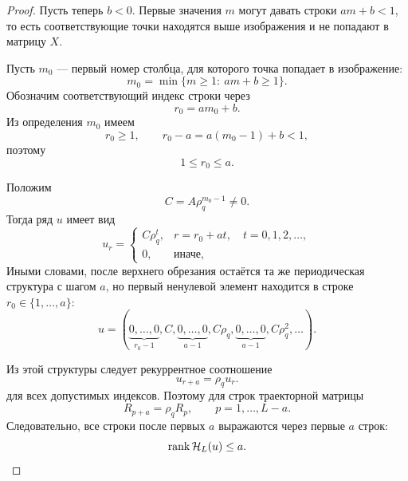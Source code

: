 \begin{proof}
Пусть теперь $b<0$. Первые значения $m$ могут давать строки $am+b<1$, то есть соответствующие точки находятся выше изображения и не попадают в матрицу $X$.

Пусть $m_0$ --- первый номер столбца, для которого точка попадает в изображение:
\begin{equation*}
    m_0=\min\{m\ge1:\ am+b\ge1\}.
\end{equation*}
Обозначим соответствующий индекс строки через
\begin{equation*}
    r_0=am_0+b.
\end{equation*}
Из определения $m_0$ имеем
\begin{equation*}
    r_0\ge1,
    \qquad
    r_0-a=a(m_0-1)+b<1,
\end{equation*}
поэтому
\begin{equation*}
    1\le r_0\le a.
\end{equation*}

Положим
\begin{equation*}
    C=A\rho_q^{m_0-1}\ne0.
\end{equation*}
Тогда ряд $u$ имеет вид
\begin{equation}
    u_r
    =
    \begin{cases}
        C\rho_q^t, & r=r_0+at,\quad t=0,1,2,\dots,\\
        0, & \text{иначе},
    \end{cases}
    \label{eq:u-negative-b-structure}
\end{equation}
Иными словами, после верхнего обрезания остаётся та же периодическая структура с шагом $a$, но первый ненулевой элемент находится в строке $r_0\in\{1,\dots,a\}$:
\begin{equation*}
    u=
    (\underbrace{0,\dots,0}_{r_0-1},
    C,
    \underbrace{0,\dots,0}_{a-1},
    C\rho_q,
    \underbrace{0,\dots,0}_{a-1},
    C\rho_q^2,
    \dots).
\end{equation*}

Из этой структуры следует рекуррентное соотношение
\begin{equation}
    u_{r+a}=\rho_q u_r.
    \label{eq:recursion-negative-b}
\end{equation}
для всех допустимых индексов. Поэтому для строк траекторной матрицы
\begin{equation*}
    R_{p+a}=\rho_q R_p,
    \qquad p=1,\dots,L-a.
\end{equation*}
Следовательно, все строки после первых $a$ выражаются через первые $a$ строк:
\begin{equation*}
    \operatorname{rank} \mathcal H_L(u)\le a.
\end{equation*}


\end{proof}
